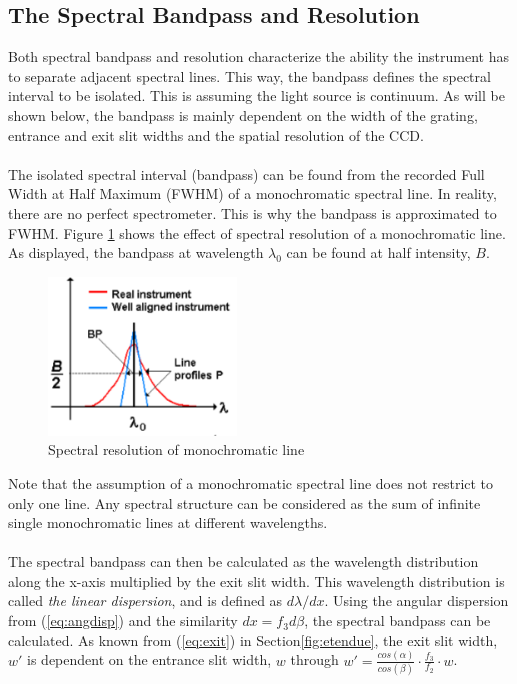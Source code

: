 \subsection{The Spectral Bandpass and Resolution} \label{sec:bp}
Both spectral bandpass and resolution characterize the ability the instrument has to separate adjacent spectral lines. This way, the bandpass defines the spectral interval to be isolated. This is assuming the light source is continuum. As will be shown below, the bandpass is mainly dependent on  the width of the grating, entrance and exit slit widths and the spatial resolution of the CCD. 
\\\\
The isolated spectral interval (bandpass) can be found from the recorded Full Width at Half Maximum (FWHM) of a monochromatic spectral line. In reality, there are no perfect spectrometer. This is why the bandpass is approximated to FWHM. Figure \ref{fig:bp} shows the effect of spectral resolution of a monochromatic line. As displayed, the bandpass at wavelength $\lambda_0$ can be found at half intensity, $B$. 

\begin{figure}[H]
    \centering
    \includegraphics[width=5cm]{Images/theory/bp.png}
    \caption{Spectral resolution of monochromatic line}
    \label{fig:bp}
\end{figure}
\noindent
Note that the assumption of a monochromatic spectral line does not restrict to only one line. Any spectral structure can be considered as the sum of infinite single monochromatic lines at different wavelengths.
\\\\
The spectral bandpass can then be calculated as the wavelength distribution along the x-axis multiplied by the exit slit width. This wavelength distribution is called \textit{the linear dispersion}, and is defined as $d\lambda/dx$. Using the angular dispersion from (\ref{eq:angdisp}) and the similarity $dx = f_3 d\beta$, the spectral bandpass can be calculated. As known from (\ref{eq:exit}) in Section\ref{fig:etendue}, the exit slit width, $w'$ is dependent on the entrance slit width, $w$ through $w' = \frac{cos(\alpha)}{cos(\beta)}\cdot \frac{f_3}{f_2}\cdot w$.

